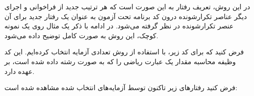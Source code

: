 در این روش، تعریف رفتار به این صورت است که هر ترتیب جدید از فراخوانی و اجرای دیگر عناصر تکرارشونده درون کد برنامه تحت آزمون به عنوان یک رفتار جدید برای آن عنصر تکرارشونده در نظر گرفته می‌شود. در ادامه با ذکر یک مثال روی یک نمونه کوچک، این روش به صورت کامل توضیح داده می‌شود.

فرض کنید که برای کد زیر، با استفاده از روش  تعدادی آزمایه انتخاب کرده‌ایم. این کد وظیفه محاسبه مقدار یک عبارت ریاضی را که به صورت رشته داده شده است، بر عهده دارد.
\newpage
\begin{figure}[!h]
	\begin{LTR}
		\singlespacing
		
	\end{LTR}
\end{figure}

فرض کنید رفتارهای زیر تاکنون توسط آزمایه‌های انتخاب شده مشاهده شده است:

